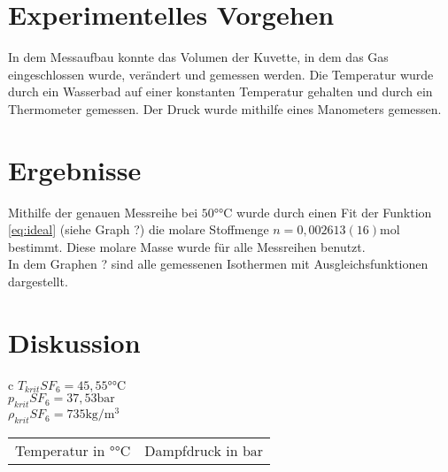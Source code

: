 \documentclass[11pt, a4paper]{article}
\begin{document}
    \section{Experimentelles Vorgehen}
    In dem Messaufbau konnte das Volumen der Kuvette, in dem das Gas eingeschlossen wurde, verändert und gemessen werden.
    Die Temperatur wurde durch ein Wasserbad auf einer konstanten Temperatur gehalten und durch ein Thermometer gemessen. 
    Der Druck wurde mithilfe eines Manometers gemessen.

    \section{Ergebnisse}
    Mithilfe der genauen Messreihe bei $50 \si{\degree \celsius}$ wurde durch einen Fit der
    Funktion \ref{eq:ideal} (siehe Graph ?) die molare Stoffmenge $n = 0,002613(16) \si{\mole}$ bestimmt.
    Diese molare Masse wurde für alle Messreihen benutzt. \\

    In dem Graphen ? sind alle gemessenen Isothermen mit Ausgleichsfunktionen dargestellt.

    \section{Diskussion}
    \begin{table}
        \centering
        \begin{tabular}{c}
            $T_{krit} SF_6 = 45,55 \si{\degree \celsius}$ \cite{SH6} \\
            $p_{krit} SF_6 = 37,53 \si{\bar}$ \cite{SH6} \\
            $\rho_{krit} SF_6 = 735 \si{\kilogram \per \meter \cubed}$ \cite{SH6} \\
            \begin{tabular}{c c}
                Temperatur in $\si{\degree\celsius}$ & Dampfdruck in $\si{\bar}$ \\
                
            \end{tabular}
        \end{tabular}
    \end{table}


    
    
\end{document}

